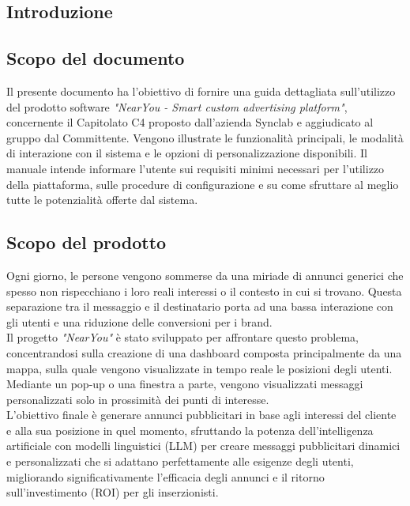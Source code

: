 \documentclass[10pt]{article}
\begin{document}
\newpage
\tableofcontents
\newpage
\listoffigures
\newpage
\listoftables

\newpage
\begin{justify}

\section{Introduzione}
\label{introduzione}

\subsection{Scopo del documento}
Il presente documento ha l'obiettivo di fornire una guida dettagliata sull'utilizzo del prodotto software \textit{"NearYou - Smart custom advertising platform"}, concernente il Capitolato C4 proposto dall'azienda Synclab e aggiudicato al gruppo dal Committente. Vengono illustrate le funzionalità principali, le modalità di interazione con il sistema e le opzioni di personalizzazione disponibili. Il manuale intende informare l'utente sui requisiti minimi necessari per l'utilizzo della piattaforma, sulle procedure di configurazione e su come sfruttare al meglio tutte le potenzialità offerte dal sistema.

\subsection{Scopo del prodotto}
Ogni giorno, le persone vengono sommerse da una miriade di annunci generici che spesso non rispecchiano i loro reali interessi o il contesto in cui si trovano. Questa separazione tra il messaggio e il destinatario porta ad una bassa interazione con gli utenti e una riduzione delle conversioni per i brand.\\
Il progetto \textit{"NearYou"} è stato sviluppato per affrontare questo problema, concentrandosi sulla creazione di una dashboard composta principalmente da una mappa, sulla quale vengono visualizzate in tempo reale le posizioni degli utenti. Mediante un pop-up o una finestra a parte, vengono visualizzati messaggi personalizzati solo in prossimità dei punti di interesse.\\
L'obiettivo finale è generare annunci pubblicitari in base agli interessi del cliente e alla sua posizione in quel momento, sfruttando la potenza dell'intelligenza artificiale con modelli linguistici (LLM) per creare messaggi pubblicitari dinamici e personalizzati che si adattano perfettamente alle esigenze degli utenti, migliorando significativamente l'efficacia degli annunci e il ritorno sull'investimento (ROI) per gli inserzionisti.


\end{justify}
\end{document}
